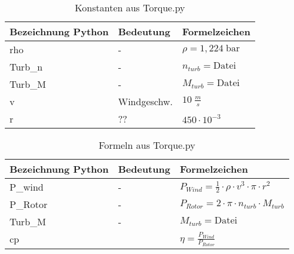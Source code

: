 \newpage  

\begin{table}[h!]

\centering
\caption{Konstanten aus Torque.py}
\renewcommand{\arraystretch}{2}
\setlength{\tabcolsep}{7mm}

\begin{tabular}{lll}
    \toprule
     Bezeichnung Python & Bedeutung & Formelzeichen\\
    \midrule
    rho &-&$\rho   = 1,224\; \text{bar}$\\
    Turb\_n &-&$n_{turb} = \text{Datei}$\\
    Turb\_M &-&$M_{turb} = \text{Datei}$\\
    v &Windgeschw.&$10\; \frac{m}{s}$\\
    r&??&$450 \cdot 10^{-3}$\\
 

    \bottomrule
  \end{tabular}
\end{table}

\begin{table}[h!]

\centering
\caption{Formeln aus Torque.py}
\renewcommand{\arraystretch}{2}
\setlength{\tabcolsep}{7mm}

\begin{tabular}{lll}
    \toprule
     Bezeichnung Python & Bedeutung & Formelzeichen\\
    \midrule
    P\_wind &-&$P_{Wind}   = \frac{1}{2}\cdot \rho  \cdot v^3 \cdot \pi \cdot r^2 $\\
    P\_Rotor &-&$P_{Rotor}   = 2 \cdot \pi \cdot n_ {turb} \cdot M_{turb}$\\
    Turb\_M &-&$M_{turb} = \text{Datei}$\\ 
    cp &&$\eta  = \frac{P_{Wind}}{P_{Rotor}}$\\
 

    \bottomrule
  \end{tabular}
\end{table} 